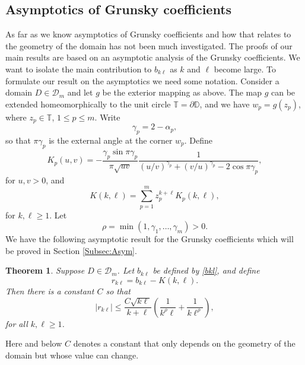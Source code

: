 \documentclass{article}
\numberwithin{equation}{section}
\numberwithin{figure}{section}
\theoremstyle{plain}
\theoremstyle{plain}
\numberwithin{thm}{section}
\newtheorem{theorem}[thm]{Theorem}
\theoremstyle{remark}
\newcommand{\T}{\mathbb{T}}
\newcommand{\D}{\mathbb{D}}
\let \le \leqslant
\let \ge \geqslant
\begin{document}
\subsection{Asymptotics of Grunsky coefficients}
As far as we know asymptotics of Grunsky coefficients and how that relates to the geometry of the domain has not been much investigated.
The proofs of our main results are based on an asymptotic analysis of the Grunsky coefficients. We want to isolate the main contribution to $b_{k\ell}$ as $k$ and $\ell$ become large. To formulate our result on the asymptotics we need some notation.
Consider a domain $D\in\mathcal{D}_m$ and let $g$ be the exterior mapping as above. The map $g$ can be extended homeomorphically to the unit circle $\T=\partial\D$, and we have
$w_p=g(z_p)$, where $z_p\in\T$, $1\le p\le m$. Write
\begin{equation}\label{gammap}
\gamma_p=2-\alpha_p,
\end{equation}
so that $\pi\gamma_p$ is the external angle at the corner $w_p$. Define 
\begin{equation}\label{Kpkl}
K_p(u,v)=-\frac{\gamma_p\sin\pi\gamma_p}{\pi\sqrt{uv}}\frac 1{(u/v)^{\gamma_p}+(v/u)^{\gamma_p}-2\cos\pi\gamma_p},
\end{equation}
for $u,v>0$, and
\begin{equation}\label{Kkl}
K(k,\ell)=\sum_{p=1}^mz_p^{k+\ell}K_p(k,\ell),
\end{equation}
for $k,\ell\ge 1$. Let
\begin{equation}\label{rho}
\rho=\min(1,\gamma_1,\dots,\gamma_m) > 0.
\end{equation}
We have the following asymptotic result for the Grunsky coefficients which will be proved in Section \ref{Subsec:Asym}.

\begin{theorem}\label{Thm:bklAs}
Suppose $D \in \mathcal{D}_m$. Let $b_{k\ell}$ be defined by \eqref{bkl}, and define
\begin{equation}\label{rkl}
r_{k\ell}=b_{k\ell}-K(k,\ell).
\end{equation}
Then there is a constant $C$ so that
\begin{equation}\label{rklEst}
|r_{k\ell}|\le\frac{C\sqrt{k\ell}}{k+\ell}\left(\frac 1{k^\rho\ell}+\frac 1{k\ell^\rho}\right),
\end{equation}
for all $k,\ell\ge 1$.
\end{theorem}
Here and below $C$ denotes a constant that only depends on the geometry of the domain but whose value can change.
\end{document}
